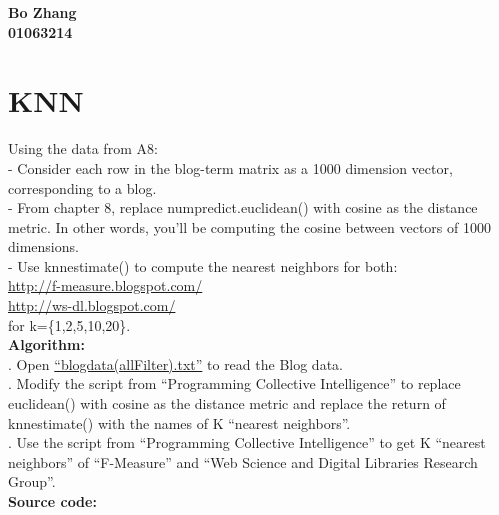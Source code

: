 \documentclass{article}
\begin{document}
		\begin{center}\textbf{Bo Zhang\\01063214}
		\end{center}
		\section{KNN}
		Using the data from A8:\\
		- Consider each row in the blog-term matrix as a 1000 dimension vector, corresponding to a blog.\\
		- From chapter 8, replace numpredict.euclidean() with cosine as the distance metric. In other words, you'll be computing the cosine between vectors of 1000 dimensions.\\
		- Use knnestimate() to compute the nearest neighbors for both:\\
		\indent\url{http://f-measure.blogspot.com/}\\
		\indent\url{http://ws-dl.blogspot.com/}\\
		for k=\{1,2,5,10,20\}.\\

		\noindent\textbf{Algorithm: }\\
		. Open \href{https://github.com/zhangboroy/cs532-s17/blob/master/assg10_submission/blogdata(allFilter).txt}{``blogdata(allFilter).txt''} to read the Blog data.\\
		. Modify the script from ``Programming Collective Intelligence'' to replace euclidean() with cosine as the distance metric and replace the return of knnestimate() with the names of K ``nearest neighbors''.\\
		. Use the script from ``Programming Collective Intelligence'' to get K ``nearest neighbors'' of ``F-Measure'' and ``Web Science and Digital Libraries Research Group''.\\

		\noindent\textbf{Source code:}
		
\end{document}
